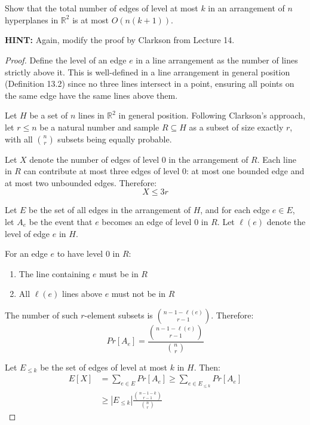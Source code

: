 \documentclass{article}
\begin{document}
  \section{}
  \begin{centerframebox}
    Show that the total number of edges of level at most \(k\) in an arrangement of \(n\) hyperplanes in \(\mathbb{R}^2\) is at most \(O(n(k + 1))\).

    \textbf{HINT:} Again, modify the proof by Clarkson from Lecture 14.
  \end{centerframebox}

  \begin{proof}
Define the level of an edge $e$ in a line arrangement as the number of lines strictly above it. This is well-defined in a line arrangement in general position (Definition 13.2) since no three lines intersect in a point, ensuring all points on the same edge have the same lines above them.

Let $H$ be a set of $n$ lines in $\mathbb{R}^2$ in general position. Following Clarkson's approach, let $r \leq n$ be a natural number and sample $R \subseteq H$ as a subset of size exactly $r$, with all $\binom{n}{r}$ subsets being equally probable.

Let $X$ denote the number of edges of level 0 in the arrangement of $R$. Each line in $R$ can contribute at most three edges of level 0: at most one bounded edge and at most two unbounded edges. Therefore:
\[X \leq 3r \tag{1}\]

Let $E$ be the set of all edges in the arrangement of $H$, and for each edge $e \in E$, let $A_e$ be the event that $e$ becomes an edge of level 0 in $R$. Let $\ell(e)$ denote the level of edge $e$ in $H$.

For an edge $e$ to have level 0 in $R$:
\begin{enumerate}
\item The line containing $e$ must be in $R$
\item All $\ell(e)$ lines above $e$ must not be in $R$
\end{enumerate}

The number of such $r$-element subsets is $\binom{n-1-\ell(e)}{r-1}$. Therefore:
\[Pr[A_e] = \frac{\binom{n-1-\ell(e)}{r-1}}{\binom{n}{r}}\]

Let $E_{\leq k}$ be the set of edges of level at most $k$ in $H$. Then:
\begin{align*}
E[X] &= \sum_{e \in E} Pr[A_e] \geq \sum_{e \in E_{\leq k}} Pr[A_e] \\
&\geq |E_{\leq k}| \frac{\binom{n-1-k}{r-1}}{\binom{n}{r}}
\end{align*}


\end{proof}
\end{document}
